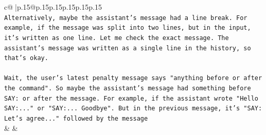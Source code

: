 \documentclass{article}
\begin{document}
{\begin{supertabular}{c@{$\;$}|p{.15\linewidth}@{}p{.15\linewidth}p{.15\linewidth}p{.15\linewidth}p{.15\linewidth}p{.15\linewidth}}
{{{\\ 
\texttt{Alternatively, maybe the assistant's message had a line break. For example, if the message was split into two lines, but in the input, it's written as one line. Let me check the exact message. The assistant's message was written as a single line in the history, so that's okay.} \\
\\ 
\texttt{Wait, the user's latest penalty message says "anything before or after the command". So maybe the assistant's message had something before SAY: or after the message. For example, if the assistant wrote "Hello SAY:..." or "SAY:... Goodbye". But in the previous message, it's "SAY: Let's agree..." followed by the message} \\
            }
        }
    }
    & & \\ \\


\end{supertabular}}
\end{document}

